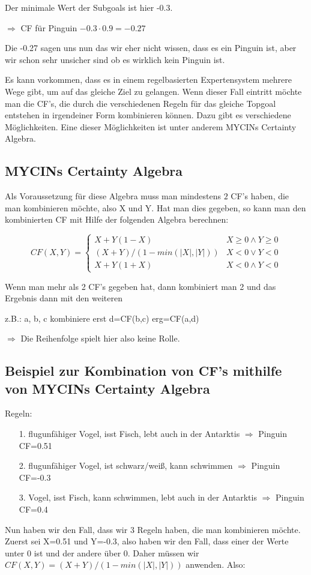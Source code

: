 Der minimale Wert der Subgoals ist hier -0.3.

$\Rightarrow$ CF für Pinguin $-0.3 \cdot 0.9 = -0.27$

Die -0.27 sagen uns nun das wir eher nicht wissen, dass es ein Pinguin ist, aber wir schon sehr unsicher sind ob es wirklich kein Pinguin ist.



Es kann vorkommen, dass es in einem regelbasierten Expertensystem mehrere Wege gibt, um auf das gleiche Ziel zu gelangen. Wenn dieser Fall eintritt möchte man die CF's, die durch die verschiedenen Regeln für das gleiche Topgoal entstehen in irgendeiner Form kombinieren können. Dazu gibt es verschiedene Möglichkeiten. Eine dieser Möglichkeiten ist unter anderem MYCINs Certainty Algebra.


\subsection{MYCINs Certainty Algebra}
Als Voraussetzung für diese Algebra muss man mindestens $2$ CF's haben, die man kombinieren möchte, also X und Y. 
Hat man dies gegeben, so kann man den kombinierten CF mit Hilfe der folgenden Algebra berechnen:

	$$
	CF(X,Y) = 
	\begin{cases}
		X+Y \left(1-X\right) 
		  & X \ge 0 \wedge Y \ge 0 \\
		\left( X+Y\right)
		/ \left(1-min \left(|X|, |Y|\right)\right) &  X < 0 \vee Y < 0 \\
		X+Y \left(1+X\right)  & X < 0 \wedge Y < 0
	\end{cases}
	$$

Wenn man mehr als 2 CF's gegeben hat, dann kombiniert man 2 und das Ergebnis dann mit den weiteren 

z.B.: a, b, c kombiniere erst d=CF(b,c) erg=CF(a,d)

$\Rightarrow$ Die Reihenfolge spielt hier also keine Rolle.



\subsection*{Beispiel zur Kombination von CF's mithilfe von MYCINs Certainty Algebra}
Regeln:
\begin{itemize}
		\item[1.] flugunfähiger Vogel, isst Fisch, lebt auch in der Antarktis $\Rightarrow$ Pinguin CF=0.51
		\item[2.] flugunfähiger Vogel, ist schwarz/weiß, kann schwimmen $\Rightarrow$ Pinguin CF=-0.3
			\item[3.]  Vogel, isst Fisch, kann schwimmen, lebt auch in der Antarktis $\Rightarrow$ Pinguin CF=0.4
\end{itemize} 
Nun haben wir den Fall, dass wir 3 Regeln haben, die man kombinieren möchte.
Zuerst sei X=0.51 und Y=-0.3, also haben wir den Fall, dass einer der Werte unter 0 ist und der andere über 0. Daher müssen wir $CF \left( X,Y \right) =\left( X+Y\right) / \left(1-min \left(|X|, |Y|\right) \right)$ anwenden. Also:


